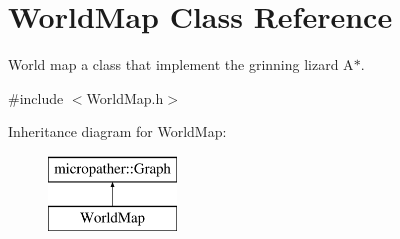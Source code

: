 \hypertarget{class_world_map}{\section{World\-Map Class Reference}
\label{class_world_map}
}


World map a class that implement the grinning lizard A$\ast$.  




{\ttfamily \#include $<$World\-Map.\-h$>$}

Inheritance diagram for World\-Map\-:\begin{figure}[H]
\begin{center}
\leavevmode
\includegraphics[height=2.000000cm]{class_world_map}
\end{center}
\end{figure}
